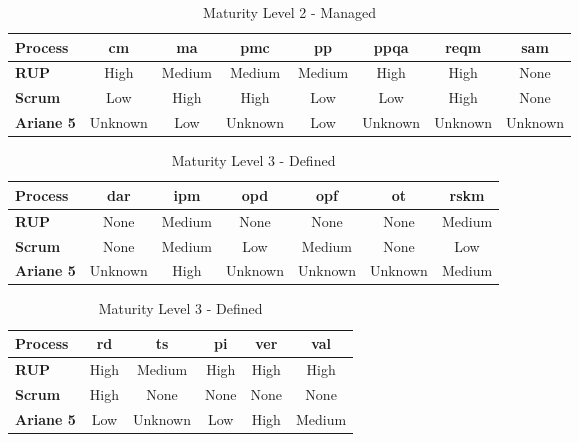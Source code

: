 
\begin{table}[ht!]
    \centering
    \begin{tabular}{>{\bfseries}l|*{7}{c}}
        Process     & \acs{cm} & \acs{ma} & \acs{pmc} & \acs{pp} & \acs{ppqa} & \acs{reqm} & \acs{sam}  \\
        \midrule
        RUP         & High & Medium & Medium & Medium & High & High & None \\ 
        Scrum       & Low & High & High & Low & Low & High & None \\ 
        Ariane 5    & Unknown & Low & Unknown & Low & Unknown & Unknown & Unknown \\ 
    \end{tabular}
    \caption{Maturity Level 2 - Managed}
    \label{tab:cmmi_l2}
\end{table}


\begin{table}[ht!]
    \centering
    \begin{tabular}{>{\bfseries}l|*{6}{c}}
        Process & \acs{dar} & \acs{ipm} & \acs{opd} & \acs{opf} & \acs{ot} & \acs{rskm} \\
        \midrule
        RUP     & None & Medium & None & None & None & Medium \\
        Scrum   & None & Medium & Low & Medium & None & Low \\ 
        Ariane 5 & Unknown & High & Unknown & Unknown & Unknown & Medium \\
    \end{tabular}
    \vspace{\baselineskip}\linebreak
    \begin{tabular}{>{\bfseries}l|*{5}{c}}
         Process & \acs{rd} & \acs{ts} & \acs{pi} & \acs{ver} & \acs{val} \\
         \midrule
         RUP & High & Medium & High & High & High \\ 
         Scrum & High & None & None & None & None \\ 
         Ariane 5 & Low & Unknown & Low & High & Medium \\ 
    \end{tabular}
    \caption{Maturity Level 3 - Defined}
    \label{tab:cmmi_l3}
\end{table}


